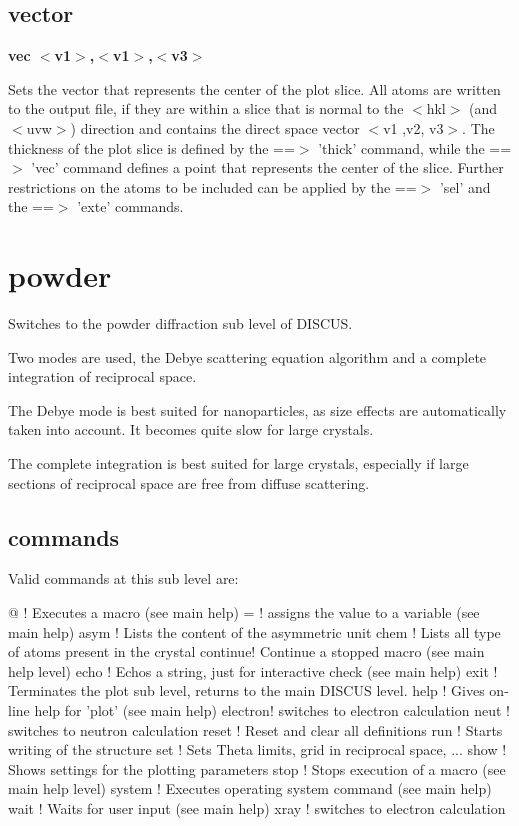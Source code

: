 \subsection*{vector}
{\bf vec $ <$v1$> $,$ <$v1$> $,$ <$v3$> $ \par }
\par
\vspace{3pt}
Sets the vector that represents the center of the plot slice. 
All atoms are written to the output file, if they are within a slice 
that is normal to the $ <$hkl$> $ (and $ <$uvw$> $) direction and contains the 
direct space vector $ <$v1 ,v2, v3$> $. The thickness of the plot 
slice is defined by the ==$> $ 'thick' command, while the ==$> $ 'vec' command 
defines a point that represents the center of the slice. 
Further restrictions on the atoms to be included can be applied by 
the ==$> $ 'sel' and the ==$> $ 'exte' commands. 
\section{powder}
\par
Switches to the powder diffraction sub level of DISCUS. 
\par
Two modes are used, the Debye scattering equation algorithm and a 
complete integration of reciprocal space. 
\par
The Debye mode is best suited for nanoparticles, as size effects 
are automatically taken into account. It becomes quite slow for 
large crystals. 
\par
The complete integration is best suited for large crystals, especially 
if large sections of reciprocal space are free from diffuse scattering. 
\par
\subsection*{commands}
Valid commands at this sub level are: 
\par
\begin{MacVerbatim}
@       ! Executes a macro (see main help)
=       ! assigns the value to a variable (see main help)
asym    ! Lists the content of the asymmetric unit
chem    ! Lists all type of atoms present in the crystal
continue! Continue a stopped macro (see main help level)
echo    ! Echos a string, just for interactive check (see main help)
exit    ! Terminates the plot sub level, returns to the main DISCUS level.
help    ! Gives on-line help for 'plot' (see main help)
electron! switches to electron calculation
neut    ! switches to neutron calculation
reset   ! Reset and clear all definitions
run     ! Starts writing of the structure
set     ! Sets Theta limits, grid in reciprocal space, ...
show    ! Shows settings for the plotting parameters
stop    ! Stops execution of a macro (see main help level)
system  ! Executes operating system command (see main help)
wait    ! Waits for user input (see main help)
xray    ! switches to electron calculation
\end{MacVerbatim}
